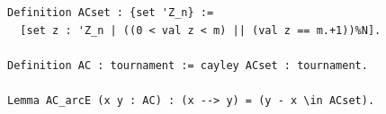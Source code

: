 \begin{lstlisting}[language=Rocq]
Definition ACset : {set 'Z_n} :=
  [set z : 'Z_n | ((0 < val z < m) || (val z == m.+1))%N].

Definition AC : tournament := cayley ACset : tournament.

Lemma AC_arcE (x y : AC) : (x --> y) = (y - x \in ACset).
\end{lstlisting}
